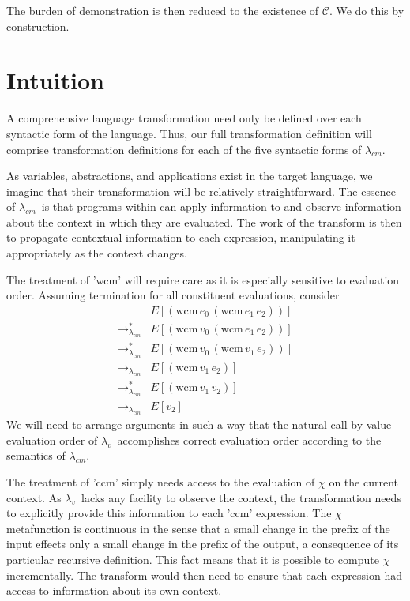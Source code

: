 \documentclass[ms,electronic,twosidetoc,letterpaper,chaptercenter,parttop]{byumsphd}
\newcommand{\lv}{$\lambda_v$}
\newcommand{\cm}{$\lambda_{cm}$}
\newcommand{\cmrr}{\rightarrow_{\lambda_{cm}}}
\newcommand{\cmrrs}{\rightarrow_{\lambda_{cm}}^{*}}
\newcommand{\wcm}[2]{(\mathrm{wcm}\,#1\,#2)}
\begin{document}
The burden of demonstration is then reduced to the existence of $\mathcal{C}$. We do this by construction.

\section{Intuition}

A comprehensive language transformation need only be defined over each syntactic form of the language. Thus, our full transformation definition will comprise transformation definitions for each of the five syntactic forms of \cm.

As variables, abstractions, and applications exist in the target language, we imagine that their transformation will be relatively straightforward. The essence of \cm\ is that programs within can apply information to and observe information about the context in which they are evaluated. The work of the transform is then to propagate contextual information to each expression, manipulating it appropriately as the context changes.

The treatment of \scheme'wcm' will require care as it is especially sensitive to evaluation order. Assuming termination for all constituent evaluations, consider
\begin{align*}
       &E[\wcm{e_0}{\wcm{e_1}{e_2}}]\\
\cmrrs &E[\wcm{v_0}{\wcm{e_1}{e_2}}]\\
\cmrrs &E[\wcm{v_0}{\wcm{v_1}{e_2}}]\\
\cmrr  &E[\wcm{v_1}{e_2}]\\
\cmrrs &E[\wcm{v_1}{v_2}]\\
\cmrr  &E[v_2]
\end{align*}
We will need to arrange arguments in such a way that the natural call-by-value evaluation order of \lv\ accomplishes correct evaluation order according to the semantics of \cm.

The treatment of \scheme'ccm' simply needs access to the evaluation of $\chi$ on the current context. As \lv\ lacks any facility to observe the context, the transformation needs to explicitly provide this information to each \scheme'ccm' expression. The $\chi$ metafunction is continuous in the sense that a small change in the prefix of the input effects only a small change in the prefix of the output, a consequence of its particular recursive definition. This fact means that it is possible to compute $\chi$ incrementally. The transform would then need to ensure that each expression had access to information about its own context.
\end{document}
